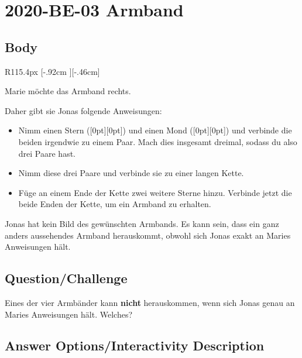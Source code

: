 \documentclass[a4paper,11pt]{report}
\newcommand{\taskGraphicsFolder}{..}
\begin{document}
\section*{\centering{} 2020-BE-03 Armband}


\subsection*{Body}

\begin{wrapfigure}{R}{115.4px}
\raisebox{-.46cm}[\dimexpr \height-.92cm \relax][-.46cm]{}
\end{wrapfigure}

Marie möchte das Armband rechts.

Daher gibt sie Jonas folgende Anweisungen:

\begin{itemize}
  \item Nimm einen Stern (\raisebox{-0.5ex}[0pt][0pt]{}) und einen Mond (\raisebox{-0.5ex}[0pt][0pt]{}) und verbinde die beiden irgendwie zu einem Paar. Mach dies insgesamt dreimal, sodass du also drei Paare hast.
  \item Nimm diese drei Paare und verbinde sie zu einer langen Kette.
  \item Füge an einem Ende der Kette zwei weitere Sterne hinzu. Verbinde jetzt die beide Enden der Kette, um ein Armband zu erhalten.
\end{itemize}

Jonas hat kein Bild des gewünschten Armbands. Es kann sein, dass ein ganz anders aussehendes Armband herauskommt, obwohl sich Jonas exakt an Maries Anweisungen hält.

{\em

\subsection*{Question/Challenge}

Eines der vier Armbänder kann \textbf{nicht} herauskommen, wenn sich Jonas genau an Maries Anweisungen hält. Welches?

}\begingroup
\renewcommand{\arraystretch}{1.5}
\subsection*{Answer Options/Interactivity Description}
\end{document}
